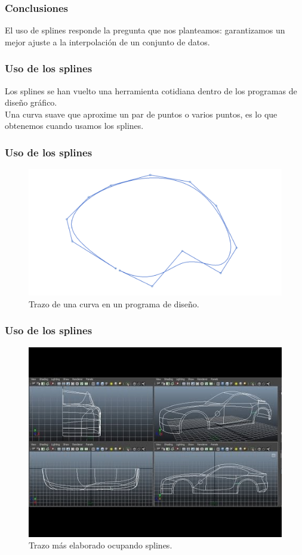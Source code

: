 \begin{frame}
\frametitle{Conclusiones}
El uso de splines responde la pregunta que nos planteamos: garantizamos un mejor ajuste a la interpolación de un conjunto de datos.
\end{frame}
\begin{frame}
\frametitle{Uso de los splines}	
Los splines se han vuelto una herramienta cotidiana dentro de los programas de diseño gráfico.
\\
\bigskip
Una curva suave que aproxime un par de puntos o varios puntos, es lo que obtenemos cuando usamos los splines.
\end{frame}
\begin{frame}
\frametitle{Uso de los splines}
\begin{figure}[h!]
	\centering
	\includegraphics[scale=0.1]{Imagenes/spline_03.png}
	\caption{Trazo de una curva en un programa de diseño.}
	\label{fig:figura_spline_03}
\end{figure}
\end{frame}
\begin{frame}
\frametitle{Uso de los splines}
\begin{figure}[h!]
	\centering
	\includegraphics[scale=0.5]{Imagenes/spline_04.png}
	\caption{Trazo más elaborado ocupando splines.}
	\label{fig:figura_spline_04}
\end{figure}
\end{frame}
